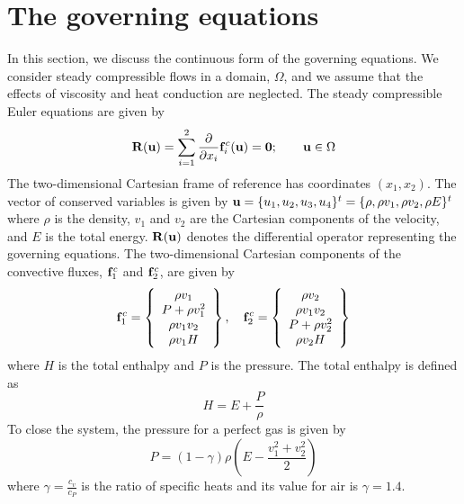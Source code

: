 \documentclass[review]{elsarticle}
\begin{document}
\section{The governing equations}
In this section, we discuss the continuous form of the governing equations. 
We consider steady compressible flows in a domain, $\Omega$, and we assume that the effects of viscosity and heat conduction are neglected.  The steady compressible Euler equations are given by
\begin{equation}
{\bf R}({\bf u}) = \sum_{i=1}^2\frac{\partial }{\partial x_i}{\bf f}_i^c({\bf u}) = {\bf 0}; \qquad {{\bf u}}\in \Omega\label{eq:EU}
\end{equation}
The two-dimensional Cartesian frame of reference has coordinates $(x_1,x_2)$. The vector of conserved variables 
is given by  \mbox{${\bf u} = \{ u_1, u_2, u_3, u_4 \}^t = \{\rho, \rho v_1, \rho v_2, \rho E\}^t$} where 
$\rho$ is the density, $v_1$ and $v_2$ are the Cartesian components of the velocity, and $E$ is the total energy.
$\bf R({\bf u})$ denotes the differential operator representing the governing equations. The two-dimensional Cartesian components of the convective fluxes, ${{\bf f}}^c_1$ and ${{\bf f}}^c_2$, are given by
\begin{equation}\label{eq:convflux}
{{\bf f}}_1^c=\left\{ {\begin{array}{c}
\rho v_1\\
P+\rho v_1^2 \\
\rho v_1 v_2 \\
\rho v_1 H\\
\end{array} } \right\},\quad 
{{\bf f}}_2^c=\left\{ {\begin{array}{c}
\rho v_2\\
\rho v_1v_2 \\
P + \rho v_2^2  \\
\rho v_2 H\\
\end{array} } \right\}
\end{equation}
where $H$ is the total enthalpy and $P$ is the pressure. The total enthalpy is defined as
\begin{equation}
H = E + \frac{P}{\rho}
\end{equation}
To close the system, the pressure for a perfect gas is given by
\begin{equation}
P  = (1 - \gamma) \rho \left(E-\frac{v_1^2+v_2^2}{2}\right)
\end{equation}
where $\gamma = \frac{c_v}{c_P}$ is the ratio of specific heats and its value for air is $\gamma = 1.4$. 
\end{document}
